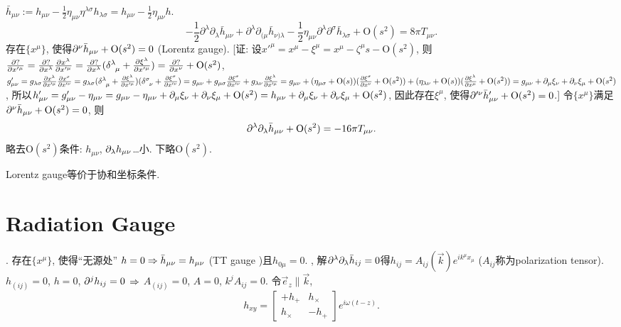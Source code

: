 $\bar{h}_{\mu\nu}:=h_{\mu\nu}-\frac{1}{2}\eta_{\mu\nu}\eta^{\lambda\sigma}h_{\lambda\sigma}=h_{\mu\nu}-\frac{1}{2}\eta_{\mu\nu}h$.
\begin{equation}
    -\frac{1}{2} \partial^{\lambda} \partial_{\lambda} \bar{h}_{\mu \nu}+\partial^{\lambda} \partial_{(\mu} \bar{h}_{\nu) \lambda}-\frac{1}{2} \eta_{\mu \nu} \partial^{\lambda} \partial^{\sigma} \bar{h}_{\lambda \sigma}+\text{O}(s^2)=8 \pi T_{\mu \nu}.
\end{equation}
存在$\{x^{\mu}\}$, 使得$\partial^{\nu}\bar{h}_{\mu\nu}+\text{O}(s^2)=0$ (Lorentz gauge). [证: 设$x'^\mu=x^\mu-\xi^\mu=x^\mu-\zeta^\mu s-\text{O}(s^2)$, 则$\frac{\p ?}{\p x'^\mu}=\frac{\p ?}{\p x^\lambda}\frac{\p x^\lambda}{\p x'^\mu}=\frac{\p ?}{\p x^\lambda}(\delta^{\lambda}_{\ph{\lambda}\mu}+\frac{\p \xi^\lambda}{\p x'^\mu})=\frac{\p ?}{\p x^\nu}+\text{O}(s^2)$, $g'_{\mu\nu}=g_{\lambda\sigma}\frac{\p x^\lambda}{\p x'^\mu}\frac{\p x^\sigma}{\p x'^\nu}=g_{\lambda\sigma}(\delta^{\lambda}_{\ph{\lambda}\mu}+\frac{\p \xi^\lambda}{\p x'^\mu})(\delta^{\sigma}_{\ph{\sigma}\nu}+\frac{\p \xi^\sigma}{\p x'^\nu})=g_{\mu\nu}+g_{\mu\sigma}\frac{\p \xi^\sigma}{\p x'^\nu}+g_{\lambda\nu}\frac{\p \xi^\lambda}{\p x'^\mu}=g_{\mu\nu}+(\eta_{\mu\sigma}+\text{O}(s))(\frac{\p \xi^\sigma}{\p x^\nu}+\text{O}(s^2))+(\eta_{\lambda\nu}+\text{O}(s))(\frac{\p \xi^\lambda}{\p x^\mu}+\text{O}(s^2))=g_{\mu\nu}+\p_\mu\xi_\nu+\p_\nu\xi_\mu+\text{O}(s^2)$, 所以$h'_{\mu\nu}=g'_{\mu\nu}-\eta_{\mu\nu}=g_{\mu\nu}-\eta_{\mu\nu}+\partial_\mu\xi_\nu+\partial_\nu\xi_\mu+\text{O}(s^2)=h_{\mu\nu}+\partial_\mu\xi_\nu+\partial_\nu\xi_\mu+\text{O}(s^2)$, 因此存在$\xi^\mu$, 使得$\partial'^{\nu}\bar{h}'_{\mu\nu}+\text{O}(s^2)=0$.] 令$\{x^{\mu}\}$满足$\partial^{\nu}\bar{h}_{\mu\nu}+\text{O}(s^2)=0$, 则
\begin{equation}
    \partial^{\lambda}\partial_{\lambda}\bar{h}_{\mu\nu}+\text{O}(s^2)=-16\pi T_{\mu \nu}.\label{lin_gravity}
\end{equation}
略去$\text{O}(s^2)$条件: $h_{\mu\nu}$, $\partial_\lambda h_{\mu\nu}$\dots{}小. 下略$\text{O}(s^2)$.

Lorentz gauge等价于协和坐标条件.

\section{Radiation Gauge}

\cite{Wald1984}. 存在$\{x^{\mu}\}$, 使得``无源处'' $h=0\Rightarrow\bar{h}_{\mu\nu}=h_{\mu\nu}$ (TT gauge \cite{王运永2020})且$h_{0\mu}=0$. \cite{Maggiore2014}, 解$\partial^{\lambda}\partial_{\lambda}\bar{h}_{ij}=0$得$h_{ij}=A_{ij}(\vec{k})e^{ik^\mu x_\mu}$ ($A_{ij}$称为polarization tensor). $h_{(ij)}=0$, $h=0$, $\partial^{j}h_{ij}=0$ $\Rightarrow$ $A_{(ij)}=0$, $A=0$, $k^{j}A_{ij}=0$. 令$\vec{e}_z\parallel\vec{k}$,
\begin{equation}
    h_{xy}=\begin{bmatrix}
        +h_+&h_\times\\
        h_\times&-h_+
    \end{bmatrix}e^{i\omega(t-z)}.\label{h_xy}
\end{equation}

